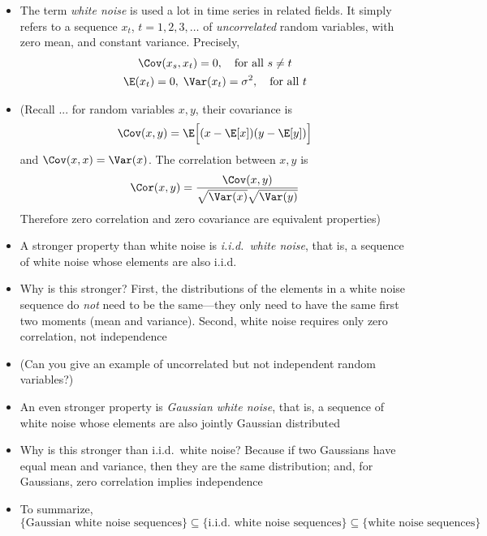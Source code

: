 \documentclass{article}
\begin{document}
\begin{itemize}
\item The term \emph{white noise} is used a lot in time series in related
  fields. It simply refers to a sequence $x_t$, $t = 1,2,3,\dots$ of
  \emph{uncorrelated} random variables, with zero mean, and constant
  variance. Precisely, 
  \begin{gather*}
  \Cov(x_s, x_t) = 0, \quad \text{for all $s \not= t$} \\
  \E(x_t) = 0, \; \Var(x_t) = \sigma^2, \quad \text{for all $t$} 
  \end{gather*}

\item (Recall ... for random variables $x,y$, their covariance is 
  \[
  \Cov(x, y) = \E\Big[ (x - \E[x]) (y - \E[y]) \Big]
  \]
  and $\Cov(x, x) = \Var(x)$. The correlation between $x,y$ is
  \[
  \Cor(x, y) = \frac{\Cov(x, y)}{\sqrt{\Var(x)} \sqrt{\Var(y)}}
  \]
  Therefore zero correlation and zero covariance are equivalent properties)

\item A stronger property than white noise is \emph{i.i.d.\ white noise}, that
  is, a sequence of white noise whose elements are also i.i.d.

\item Why is this stronger? First, the distributions of the elements in a white
  noise sequence do \emph{not} need to be the same---they only need to have the
  same first two moments (mean and variance). Second, white noise requires only
  zero correlation, not independence 

\item (Can you give an example of uncorrelated but not independent random
  variables?) 

\item An even stronger property is \emph{Gaussian white noise}, that is, a
  sequence of white noise whose elements are also jointly Gaussian distributed 

\item Why is this stronger than i.i.d.\ white noise? Because if two Gaussians
  have equal mean and variance, then they are the same distribution; and, for
  Gaussians, zero correlation implies independence

\item To summarize, 
  \[
  \{ \text{Gaussian white noise sequences} \} \subseteq
  \{ \text{i.i.d.\ white noise sequences} \} \subseteq
  \{ \text{white noise sequences} \} 
  \]


\end{itemize}
\end{document}
